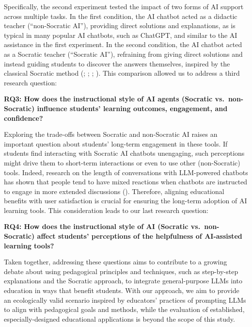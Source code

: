 \documentclass[
  11pt,
]{article}
\begin{document}
Specifically, the second experiment tested the impact of two forms of AI support across multiple tasks. In the first condition, the AI chatbot acted as a didactic teacher (``non-Socratic AI''), providing direct solutions and explanations, as is typical in many popular AI chatbots, such as ChatGPT, and similar to the AI assistance in the first experiment. In the second condition, the AI chatbot acted as a Socratic teacher (``Socratic AI''), refraining from giving direct solutions and instead guiding students to discover the answers themselves, inspired by the classical Socratic method (; ; ; ). This comparison allowed us to address a third research question:

\textbf{RQ3: How does the instructional style of AI agents (Socratic vs.~non-Socratic) influence students' learning outcomes, engagement, and confidence?}

Exploring the trade-offs between Socratic and non-Socratic AI raises an important question about students' long-term engagement in these tools. If students find interacting with Socratic AI chatbots unengaging, such perceptions might drive them to short-term interactions or even to use other (non-Socratic) tools. Indeed, research on the length of conversations with LLM-powered chatbots has shown that people tend to have mixed reactions when chatbots are instructed to engage in more extended discussions (). Therefore, aligning educational benefits with user satisfaction is crucial for ensuring the long-term adoption of AI learning tools. This consideration leads to our last research question:

\textbf{RQ4: How does the instructional style of AI (Socratic vs.~non-Socratic) affect students' perceptions of the helpfulness of AI-assisted learning tools?}

Taken together, addressing these questions aims to contribute to a growing debate about using pedagogical principles and techniques, such as step-by-step explanations and the Socratic approach, to integrate general-purpose LLMs into education in ways that benefit students. With our approach, we aim to provide an ecologically valid scenario inspired by educators' practices of prompting LLMs to align with pedagogical goals and methods, while the evaluation of established, especially-designed educational applications is beyond the scope of this study.
\end{document}
